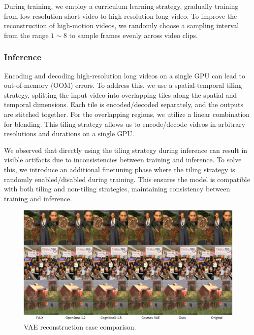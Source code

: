 During training, we employ a curriculum learning strategy, gradually training from low-resolution short video to high-resolution long video. To improve the reconstruction of high-motion videos, we randomly choose a sampling interval from the range $1 \sim 8$ to sample frames evenly across video clips.

\subsubsection{Inference}
Encoding and decoding high-resolution long videos on a single GPU can lead to out-of-memory (OOM) errors. To address this, we use a spatial-temporal tiling strategy, splitting the input video into overlapping tiles along the spatial and temporal dimensions. Each tile is encoded/decoded separately, and the outputs are stitched together. For the overlapping regions, we utilize a linear combination for blending. This tiling strategy allows us to encode/decode videos in arbitrary resolutions and durations on a single GPU.

We observed that directly using the tiling strategy during inference can result in visible artifacts due to inconsistencies between training and inference. To solve this, we introduce an additional finetuning phase where the tiling strategy is randomly enabled/disabled during training. This ensures the model is compatible with both tiling and non-tiling strategies, maintaining consistency between training and inference. 

\begin{figure}[ht]
    \centering
    \includegraphics[width=\linewidth]{figures/vae-sota-cmp.pdf}
    \caption{VAE reconstruction case comparison.}
    \label{fig:vae-sota-cmp}
\end{figure}

